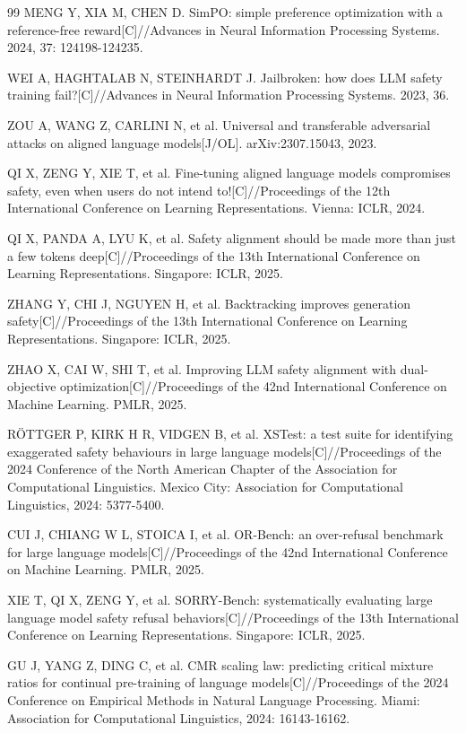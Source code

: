 \documentclass[fontset=fandol,type=master,campus=shenzhen,etitleauto=true]{hithesisbook}
\begin{document}
\begin{thebibliography}{99}
 MENG Y, XIA M, CHEN D. SimPO: simple preference optimization with a reference-free reward[C]//Advances in Neural Information Processing Systems. 2024, 37: 124198-124235.

 WEI A, HAGHTALAB N, STEINHARDT J. Jailbroken: how does LLM safety training fail?[C]//Advances in Neural Information Processing Systems. 2023, 36.

 ZOU A, WANG Z, CARLINI N, et al. Universal and transferable adversarial attacks on aligned language models[J/OL]. arXiv:2307.15043, 2023.

 QI X, ZENG Y, XIE T, et al. Fine-tuning aligned language models compromises safety, even when users do not intend to![C]//Proceedings of the 12th International Conference on Learning Representations. Vienna: ICLR, 2024.

 QI X, PANDA A, LYU K, et al. Safety alignment should be made more than just a few tokens deep[C]//Proceedings of the 13th International Conference on Learning Representations. Singapore: ICLR, 2025.

 ZHANG Y, CHI J, NGUYEN H, et al. Backtracking improves generation safety[C]//Proceedings of the 13th International Conference on Learning Representations. Singapore: ICLR, 2025.

 ZHAO X, CAI W, SHI T, et al. Improving LLM safety alignment with dual-objective optimization[C]//Proceedings of the 42nd International Conference on Machine Learning. PMLR, 2025.

 RÖTTGER P, KIRK H R, VIDGEN B, et al. XSTest: a test suite for identifying exaggerated safety behaviours in large language models[C]//Proceedings of the 2024 Conference of the North American Chapter of the Association for Computational Linguistics. Mexico City: Association for Computational Linguistics, 2024: 5377-5400.

 CUI J, CHIANG W L, STOICA I, et al. OR-Bench: an over-refusal benchmark for large language models[C]//Proceedings of the 42nd International Conference on Machine Learning. PMLR, 2025.

 XIE T, QI X, ZENG Y, et al. SORRY-Bench: systematically evaluating large language model safety refusal behaviors[C]//Proceedings of the 13th International Conference on Learning Representations. Singapore: ICLR, 2025.

 GU J, YANG Z, DING C, et al. CMR scaling law: predicting critical mixture ratios for continual pre-training of language models[C]//Proceedings of the 2024 Conference on Empirical Methods in Natural Language Processing. Miami: Association for Computational Linguistics, 2024: 16143-16162.


\end{thebibliography}
\end{document}
